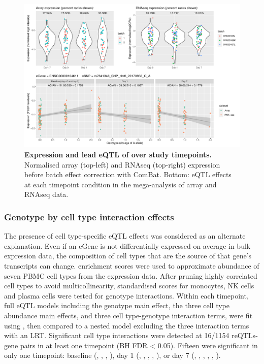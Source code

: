 \begin{figure}
    \centering
    \includegraphics[width=1.0\textwidth,page=1]{mainmatter/figures/chapter_03/plot_dge_eqtl_genotypes.ENSG00000104611,rs7841346_SNP_chr8_20170963_C_A.pdf}
    \caption{
        \textbf{Expression and lead \gls{eQTL} of  over study timepoints.}
        Normalised array (top-left) and \gls{RNAseq} (top-right) expression before batch effect correction with ComBat.
        Bottom: \gls{eQTL} effects at each timepoint condition in the mega-analysis of array and \gls{RNAseq} data.
    }
    \label{fig:hird_eQTL_ploteQTL_SH2D4A}
\end{figure}

\subsubsection{Genotype by cell type interaction effects}

The presence of cell type-specific \gls{eQTL} effects was considered as an alternate explanation.
Even if an eGene is not differentially expressed on average in bulk expression data, 
the composition of cell types that are the source of that gene's transcripts can change.
 enrichment scores were used to approximate abundance of seven \gls{PBMC} cell types from the expression data.
After pruning highly correlated cell types to avoid multicollinearity, standardised scores for monocytes, \gls{NK} cells and plasma cells were tested for genotype interactions.
Within each timepoint, full \gls{eQTL} models including the genotype main effect, the three cell type abundance main effects, and three cell type-genotype interaction terms, were fit using , 
then compared to a nested model excluding the three interaction terms with an \gls{LRT}.
Significant cell type interactions were detected at \num{16/1154} \glspl{reQTL}-gene pairs in at least one timepoint (\gls{BH} \gls{FDR} < 0.05).
Fifteen were significant in only one timepoint:
baseline (, , , ),
day 1 (, , , , ),
or day 7 (, , , , , ).

